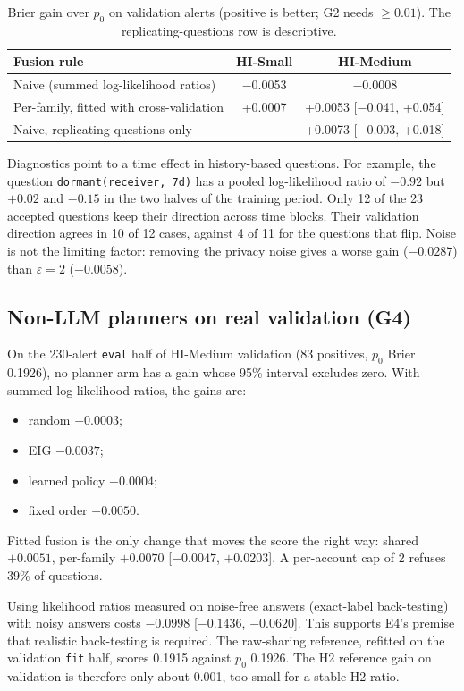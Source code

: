 \documentclass[11pt,a4paper]{article}
\newcommand{\eps}{\varepsilon}
\begin{document}
\begin{table}[!htbp]
\centering\small
\begin{tabular}{@{}lcc@{}}
\toprule
Fusion rule & HI-Small & HI-Medium \\
\midrule
Naive (summed log-likelihood ratios) & $-$0.0053 & $-$0.0008 \\
Per-family, fitted with cross-validation & +0.0007 & +0.0053 [$-$0.041, +0.054] \\
Naive, replicating questions only & -- & +0.0073 [$-$0.003, +0.018] \\
\bottomrule
\end{tabular}
\caption{Brier gain over $p_0$ on validation alerts (positive is better; G2 needs $\ge 0.01$). The replicating-questions row is descriptive.}
\label{tab:g2}
\end{table}

Diagnostics point to a time effect in history-based questions. For example, the question \texttt{dormant(receiver,~7d)} has a pooled log-likelihood ratio of $-0.92$ but $+0.02$ and $-0.15$ in the two halves of the training period. Only 12 of the 23 accepted questions keep their direction across time blocks. Their validation direction agrees in 10 of 12 cases, against 4 of 11 for the questions that flip. Noise is not the limiting factor: removing the privacy noise gives a worse gain ($-0.0287$) than $\eps=2$ ($-0.0058$).

\subsection{Non-LLM planners on real validation (G4)}

On the 230-alert \texttt{eval} half of HI-Medium validation (83 positives, $p_0$ Brier 0.1926), no planner arm has a gain whose 95\% interval excludes zero. With summed log-likelihood ratios, the gains are:
\begin{itemize}
\item random $-0.0003$;
\item EIG $-0.0037$;
\item learned policy $+0.0004$;
\item fixed order $-0.0050$.
\end{itemize}
Fitted fusion is the only change that moves the score the right way: shared $+0.0051$, per-family $+0.0070$ [$-0.0047$, $+0.0203$]. A per-account cap of 2 refuses 39\% of questions.

Using likelihood ratios measured on noise-free answers (exact-label back-testing) with noisy answers costs $-0.0998$ [$-0.1436$, $-0.0620$]. This supports E4's premise that realistic back-testing is required. The raw-sharing reference, refitted on the validation \texttt{fit} half, scores 0.1915 against $p_0$ 0.1926. The H2 reference gain on validation is therefore only about 0.001, too small for a stable H2 ratio.
\end{document}
